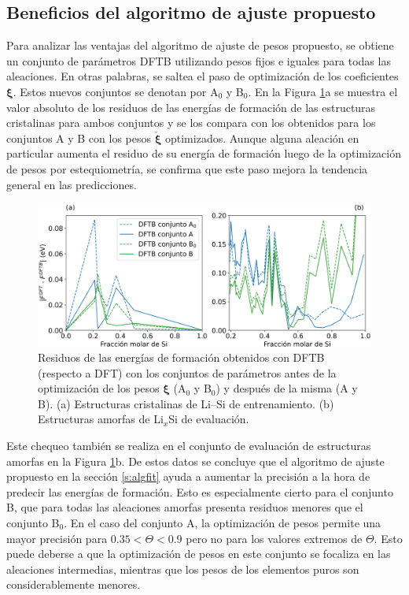 \subsection{Beneficios del algoritmo de ajuste propuesto}

Para analizar las ventajas del algoritmo de ajuste de pesos propuesto, se
obtiene un conjunto de parámetros DFTB utilizando pesos fijos e iguales para
todas las aleaciones. En otras palabras, se saltea el paso de optimización de los
coeficientes $\boldsymbol{\xi}$. Estos nuevos conjuntos se denotan por A$_0$ y
B$_0$. En la Figura \ref{fig:residuos}a se muestra el valor absoluto de los
residuos de las energías de formación de las estructuras cristalinas para ambos
conjuntos y se los compara con los obtenidos para los conjuntos A y B con
los pesos $\check{\boldsymbol{\xi}}$ optimizados. Aunque alguna aleación en
particular aumenta el residuo de su energía de formación luego de la
optimización de pesos por estequiometría, se confirma que este paso mejora
la tendencia general en las predicciones.

\begin{figure}[h]
	\centering
	\includegraphics[width=\textwidth]{Silicio/modelo/resultados/residuos/residuos.png}
	\caption{Residuos de las energías de formación obtenidos con DFTB (respecto a
	DFT) con los conjuntos de parámetros antes de la optimización de los pesos
    $\boldsymbol{\xi}$ (A$_0$ y B$_0$) y después de la misma (A y B). (a) Estructuras 
    cristalinas de Li--Si de entrenamiento. (b) Estructuras amorfas de Li$_x$Si de
    evaluación.}
	\label{fig:residuos}
\end{figure}

Este chequeo también se realiza en el conjunto de evaluación de estructuras
amorfas en la Figura \ref{fig:residuos}b. De estos datos se concluye que el
algoritmo de ajuste propuesto en la sección \ref{s:algfit} ayuda a aumentar
la precisión a la hora de predecir las energías de formación. Esto es
especialmente cierto para el conjunto B, que para todas las aleaciones amorfas
presenta residuos menores que el conjunto B$_0$. En el caso del conjunto A, 
la optimización de pesos permite una mayor precisión para $0.35 < \Theta < 0.9$ 
pero no para los valores extremos de $\Theta$. Esto puede deberse a que la 
optimización de pesos en este conjunto se focaliza en las aleaciones intermedias, 
mientras que los pesos de los elementos puros son considerablemente menores.
